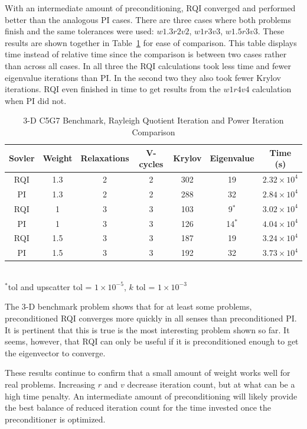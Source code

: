 With an intermediate amount of preconditioning, RQI converged and performed better than the analogous PI cases. There are three cases where both problems finish and the same tolerances were used: $w1.3r2v2$, $w1r3v3$, $w1.5r3v3$. These results are shown together in Table~\ref{table:PI RQI} for ease of comparison. This table displays time instead of relative time since the comparison is between two cases rather than across all cases. In all three the RQI calculations took less time and fewer eigenvalue iterations than PI. In the second two they also took fewer Krylov iterations. RQI even finished in time to get results from the $w1r4v4$ calculation when PI did not. 
%
\begin{table}[!h]
\caption{3-D C5G7 Benchmark, Rayleigh Quotient Iteration and Power Iteration Comparison}
\begin{center}
\begin{tabular}{| c | c | c | c | c | c | c |}
\hline
Sovler & Weight & Relaxations & V-cycles & Krylov & Eigenvalue & Time (s) \\[0.5ex]
\hline
RQI & 1.3 & 2 & 2 & 302    & 19           & $2.32 \times 10^{4}$ \\
PI    & 1.3 & 2 & 2 & 288    & 32           & $2.84 \times 10^{4}$ \\
RQI & 1    & 3 & 3 & 103    & 9$^{*}$   & $3.02 \times 10^{4}$ \\
PI    & 1    & 3 & 3 & 126    & 14$^{*}$ & $4.04 \times 10^{4}$ \\
RQI & 1.5 & 3 & 3 & 187    & 19           & $3.24 \times 10^{4}$ \\
PI    & 1.5 & 3 & 3 & 192    & 32           & $3.73 \times 10^{4}$ \\
\hline 
\end{tabular}\\
$^{*}$tol and upscatter tol = $1 \times 10^{-5}$, $k$ tol = $1 \times 10^{-3}$
\end{center}
\label{table:PI RQI}
\end{table}  

The 3-D benchmark problem shows that for at least some problems, preconditioned RQI converges more quickly in all senses than preconditioned PI. It is pertinent that this is true is the most interesting problem shown so far. It seems, however, that RQI can only be useful if it is preconditioned enough to get the eigenvector to converge. 

These results continue to confirm that a small amount of weight works well for real problems. Increasing $r$ and $v$ decrease iteration count, but at what can be a high time penalty. An intermediate amount of preconditioning will likely provide the best balance of reduced iteration count for the time invested once the preconditioner is optimized. 

